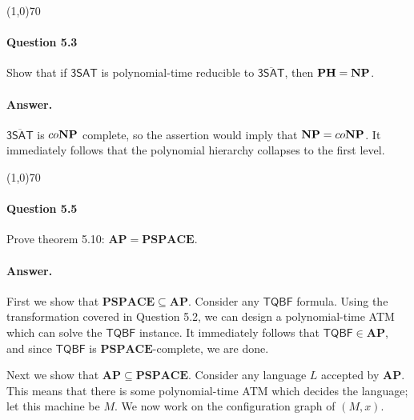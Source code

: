 \begin{center}
	\line(1,0){70}
\end{center}

\paragraph{Question 5.3} Show that if $\mathsf{3SAT}$ is polynomial-time reducible to $\overline{\mathsf{3SAT}}$, then $\mathbf{PH}=\mathbf{NP}$.

\paragraph{Answer.} $\overline{\mathsf{3SAT}}$ is $co\mathbf{NP}$ complete, so the assertion would imply that $\mathbf{NP}=co\mathbf{NP}$. It immediately follows that the polynomial hierarchy collapses to the first level.

\begin{center}
	\line(1,0){70}
\end{center}

\paragraph{Question 5.5} Prove theorem 5.10: $\mathbf{AP}=\mathbf{PSPACE}$.

\paragraph{Answer.} First we show that $\mathbf{PSPACE}\subseteq\mathbf{AP}$. Consider any $\mathsf{TQBF}$ formula. Using the transformation covered in Question 5.2, we can design a polynomial-time ATM which can solve the $\mathsf{TQBF}$ instance. It immediately follows that $\mathsf{TQBF}\in\mathbf{AP}$, and since $\mathsf{TQBF}$ is $\mathbf{PSPACE}$-complete, we are done.

Next we show that $\mathbf{AP}\subseteq\mathbf{PSPACE}$. Consider any language $L$ accepted by $\mathbf{AP}$. This means that there is some polynomial-time ATM which decides the language; let this machine be $M$. We now work on the configuration graph of $(M,x)$. 
